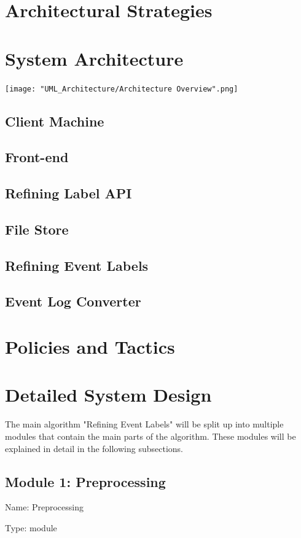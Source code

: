 \documentclass[notitlepage]{article}
\begin{document}
\begin{flushleft}
\section{Architectural Strategies}

\section{System Architecture}
\texttt{[image: "UML\_Architecture/Architecture Overview".png]}

\subsection{Client Machine}
\subsection{Front-end}
\subsection{Refining Label API}
\subsection{File Store}
\subsection{Refining Event Labels}
\subsection{Event Log Converter}

\section{Policies and Tactics}

\section{Detailed System Design}
The main algorithm "Refining Event Labels" will be split up into multiple modules that contain the main parts of the algorithm. These modules will be explained in detail in the following subsections.
\subsection{Module 1: Preprocessing}
Name: Preprocessing

Type: module


\end{flushleft}
\end{document}
